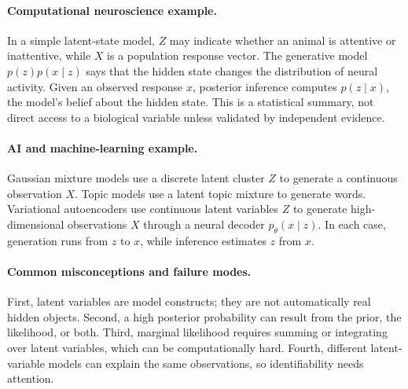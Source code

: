 \paragraph{Computational neuroscience example.}
In a simple latent-state model, \(Z\) may indicate whether an animal is attentive or inattentive, while \(X\) is a population response vector. The generative model \(p(z)p(x\mid z)\) says that the hidden state changes the distribution of neural activity. Given an observed response \(x\), posterior inference computes \(p(z\mid x)\), the model's belief about the hidden state. This is a statistical summary, not direct access to a biological variable unless validated by independent evidence.

\paragraph{AI and machine-learning example.}
Gaussian mixture models use a discrete latent cluster \(Z\) to generate a continuous observation \(X\). Topic models use a latent topic mixture to generate words. Variational autoencoders use continuous latent variables \(Z\) to generate high-dimensional observations \(X\) through a neural decoder \(p_\theta(x\mid z)\). In each case, generation runs from \(z\) to \(x\), while inference estimates \(z\) from \(x\).

\paragraph{Common misconceptions and failure modes.}
First, latent variables are model constructs; they are not automatically real hidden objects. Second, a high posterior probability can result from the prior, the likelihood, or both. Third, marginal likelihood requires summing or integrating over latent variables, which can be computationally hard. Fourth, different latent-variable models can explain the same observations, so identifiability needs attention.

